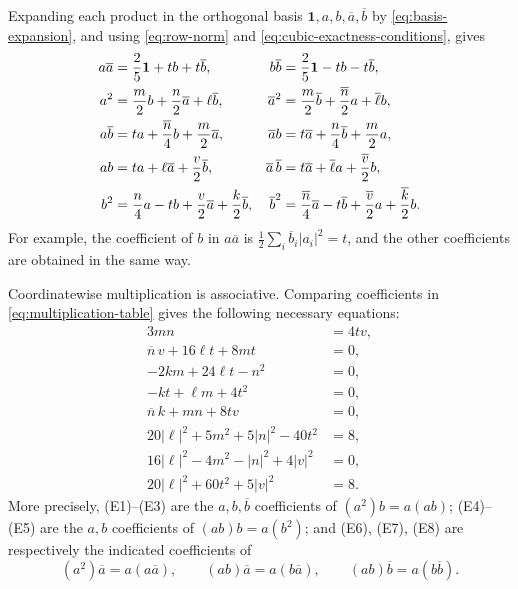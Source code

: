 \documentclass[11pt,reqno]{amsart}
\theoremstyle{definition}
\theoremstyle{remark}
\newcommand{\one}{\mathbf 1}
\newcommand{\abs}[1]{\left\lvert #1\right\rvert}
\begin{document}
Expanding each product in the orthogonal basis
$\one,a,b,\overline a,\overline b$ by \eqref{eq:basis-expansion}, and using
\eqref{eq:row-norm} and \eqref{eq:cubic-exactness-conditions}, gives
\begin{align}
a\overline a&=\frac25\one+tb+t\overline b,
&b\overline b&=\frac25\one-tb-t\overline b,\notag\\
a^2&=\frac m2b+\frac n2\overline a+\ell\overline b,
&\overline a^2&=\frac m2\overline b+\frac{\overline n}{2}a+\overline\ell b,
\notag\\
a\overline b&=ta+\frac{\overline n}{4}b+\frac m2\overline a,
&\overline a b&=t\overline a+\frac n4\overline b+\frac m2a,
\notag\\
ab&=ta+\ell\overline a+\frac v2\overline b,
&\overline a\,\overline b&=t\overline a+\overline\ell a
 +\frac{\overline v}{2}b,
\notag\\
b^2&=\frac n4a-tb+\frac v2\overline a+\frac k2\overline b,
&\overline b^2&=\frac{\overline n}{4}\overline a-t\overline b
 +\frac{\overline v}{2}a+\frac{\overline k}{2}b.
\label{eq:multiplication-table}
\end{align}
For example, the coefficient of $b$ in $a\overline a$ is
$\frac12\sum_i\overline b_i\abs{a_i}^2=t$, and the other coefficients are
obtained in the same way.

Coordinatewise multiplication is associative.  Comparing coefficients in
\eqref{eq:multiplication-table} gives the following necessary equations:
\begin{align}
3mn&=4tv,\tag{E1}\label{eq:E1}\\
\overline n\,v+16\ell t+8mt&=0,\tag{E2}\label{eq:E2}\\
-2km+24\ell t-n^2&=0,\tag{E3}\label{eq:E3}\\
-kt+\ell m+4t^2&=0,\tag{E4}\label{eq:E4}\\
\overline n\,k+mn+8tv&=0,\tag{E5}\label{eq:E5}\\
20\abs\ell^2+5m^2+5\abs n^2-40t^2&=8,\tag{E6}\label{eq:E6}\\
16\abs\ell^2-4m^2-\abs n^2+4\abs v^2&=0,\tag{E7}\label{eq:E7}\\
20\abs\ell^2+60t^2+5\abs v^2&=8.\tag{E8}\label{eq:E8}
\end{align}
More precisely, (E1)--(E3) are the $a,b,\overline b$ coefficients of
$(a^2)b=a(ab)$; (E4)--(E5) are the $a,b$ coefficients of
$(ab)b=a(b^2)$; and (E6), (E7), (E8) are respectively the indicated
coefficients of
\[
(a^2)\overline a=a(a\overline a),\qquad
(ab)\overline a=a(b\overline a),\qquad
(ab)\overline b=a(b\overline b).
\]
\end{document}

